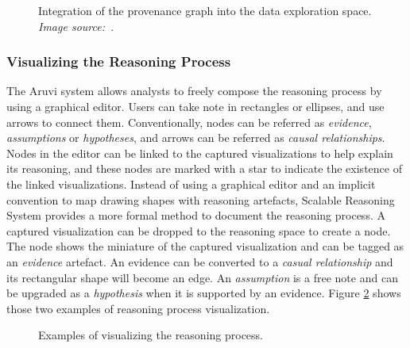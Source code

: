 \begin{figure}[ht]
\centering
{} \hspace{0.1cm}
\caption{Integration of the provenance graph into the data exploration space. \emph{Image source:~\cite{Dunne2012}}.}
\label{fig:IntegratedView}
\end{figure}

\subsubsection{Visualizing the Reasoning Process}
\label{sub:reasoningprocess}
The Aruvi system \cite{Shrinivasan2008} allows analysts to freely compose the reasoning process by using a graphical editor. Users can take note in rectangles or ellipses, and use arrows to connect them. Conventionally, nodes can be referred as \textit{evidence}, \textit{assumptions} or \textit{hypotheses}, and arrows can be referred as \textit{causal relationships}. Nodes in the editor can be linked to the captured visualizations to help explain its reasoning, and these nodes are marked with a star to indicate the existence of the linked visualizations. Instead of using a graphical editor and an implicit convention to map drawing shapes with reasoning artefacts, Scalable Reasoning System \cite{Pike2009a} provides a more formal method to document the reasoning process. A captured visualization can be dropped to the reasoning space to create a node. The node shows the miniature of the captured visualization and can be tagged as an \textit{evidence} artefact. An evidence can be converted to a \textit{casual relationship} and its rectangular shape will become an edge. An \textit{assumption} is a free note and can be upgraded as a \textit{hypothesis} when it is supported by an evidence. Figure \ref{fig:ReasoningDocumenting} shows those two examples of reasoning process visualization.

\begin{figure}[ht]
\centering
{} \hspace{0.1cm}
\caption{Examples of visualizing the reasoning process.}
\label{fig:ReasoningDocumenting}
\end{figure}


